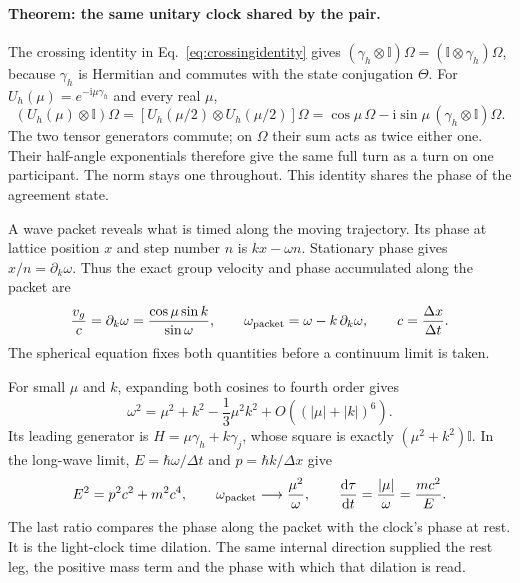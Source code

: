 \documentclass[aps,prx,onecolumn,10pt,notitlepage,nofootinbib,longbibliography]{revtex4-2}
\numberwithin{equation}{section}
\numberwithin{table}{section}
\newcommand{\Id}{\mathbb I}
\newcommand{\dd}{\mathrm d}
\newcommand{\ii}{\mathrm i}
\begin{document}
\paragraph*{Theorem: the same unitary clock shared by the pair.}
The crossing identity in Eq.~\eqref{eq:crossingidentity} gives
$(\gamma_h\otimes\Id)\Omega=(\Id\otimes\gamma_h)\Omega$, because $\gamma_h$ is Hermitian and commutes with the state conjugation $\Theta$. For $U_h(\mu)=e^{-\ii\mu\gamma_h}$ and every real $\mu$,
\begin{equation}
 (U_h(\mu)\otimes\Id)\Omega
 =[U_h(\mu/2)\otimes U_h(\mu/2)]\Omega
 =\cos\mu\,\Omega-\ii\sin\mu\,(\gamma_h\otimes\Id)\Omega.
 \label{eq:unitaryclocksharing}
\end{equation}
The two tensor generators commute; on $\Omega$ their sum acts as twice either one. Their half-angle exponentials therefore give the same full turn as a turn on one participant. The norm stays one throughout. This identity shares the phase of the agreement state. 

A wave packet reveals what is timed along the moving trajectory. Its phase at lattice position $x$ and step number $n$ is $kx-\omega n$. Stationary phase gives $x/n=\partial_k\omega$. Thus the exact group velocity and phase accumulated along the packet are
\begin{equation}
 \frac{v_g}{c}=\partial_k\omega
 =\frac{\cos\mu\sin k}{\sin\omega},
 \qquad
 \omega_{\rm packet}=\omega-k\,\partial_k\omega,
 \qquad c=\frac{\Delta x}{\Delta t}.
 \label{eq:packetclock}
\end{equation}
The spherical equation fixes both quantities before a continuum limit is taken.

For small $\mu$ and $k$, expanding both cosines to fourth order gives
\begin{equation}
 \omega^2=\mu^2+k^2-\frac13\mu^2k^2
 +O\!\left((|\mu|+|k|)^6\right).
 \label{eq:clockexpansion}
\end{equation}
Its leading generator is $H=\mu\gamma_h+k\gamma_j$, whose square is exactly $(\mu^2+k^2)\Id$. In the long-wave limit, $E=\hbar\omega/\Delta t$ and $p=\hbar k/\Delta x$ give
\begin{equation}
 E^2=p^2c^2+m^2c^4,\qquad
 \omega_{\rm packet}\longrightarrow\frac{\mu^2}{\omega},
 \qquad
 \frac{\dd\tau}{\dd t}=\frac{|\mu|}{\omega}
 =\frac{mc^2}{E}.
 \label{eq:clocklimit}
\end{equation}
The last ratio compares the phase along the packet with the clock's phase at rest. It is the light-clock time dilation. The same internal direction supplied the rest leg, the positive mass term and the phase with which that dilation is read.
\end{document}
